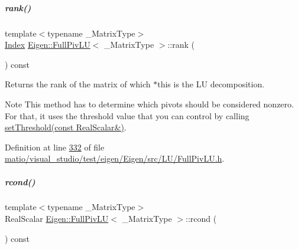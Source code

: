 \mbox{\label{group___l_u___module_a67a870aa69e699e058d04802ba0bdad9}} 
\subparagraph{\texorpdfstring{rank()}{rank()}\hspace{0.1cm}{\footnotesize\ttfamily [2/2]}}
{\footnotesize\ttfamily template$<$typename \+\_\+\+Matrix\+Type$>$ \\
\hyperlink{group___core___module_a554f30542cc2316add4b1ea0a492ff02}{Index} \hyperlink{group___l_u___module_class_eigen_1_1_full_piv_l_u}{Eigen\+::\+Full\+Piv\+LU}$<$ \+\_\+\+Matrix\+Type $>$\+::rank (\begin{DoxyParamCaption}{ }\end{DoxyParamCaption}) const\hspace{0.3cm}{\ttfamily [inline]}}

\begin{DoxyReturn}{Returns}
the rank of the matrix of which $\ast$this is the LU decomposition.
\end{DoxyReturn}
\begin{DoxyNote}{Note}
This method has to determine which pivots should be considered nonzero. For that, it uses the threshold value that you can control by calling \hyperlink{group___l_u___module_a414592d82de98f5bd075965caf56d681}{set\+Threshold(const Real\+Scalar\&)}. 
\end{DoxyNote}


Definition at line \hyperlink{matio_2visual__studio_2test_2eigen_2_eigen_2src_2_l_u_2_full_piv_l_u_8h_source_l00332}{332} of file \hyperlink{matio_2visual__studio_2test_2eigen_2_eigen_2src_2_l_u_2_full_piv_l_u_8h_source}{matio/visual\+\_\+studio/test/eigen/\+Eigen/src/\+L\+U/\+Full\+Piv\+L\+U.\+h}.

\mbox{\label{group___l_u___module_a0bc63f910960dc3e35acecc8442025b6}} 
\subparagraph{\texorpdfstring{rcond()}{rcond()}\hspace{0.1cm}{\footnotesize\ttfamily [1/2]}}
{\footnotesize\ttfamily template$<$typename \+\_\+\+Matrix\+Type$>$ \\
Real\+Scalar \hyperlink{group___l_u___module_class_eigen_1_1_full_piv_l_u}{Eigen\+::\+Full\+Piv\+LU}$<$ \+\_\+\+Matrix\+Type $>$\+::rcond (\begin{DoxyParamCaption}{ }\end{DoxyParamCaption}) const\hspace{0.3cm}{\ttfamily [inline]}}

